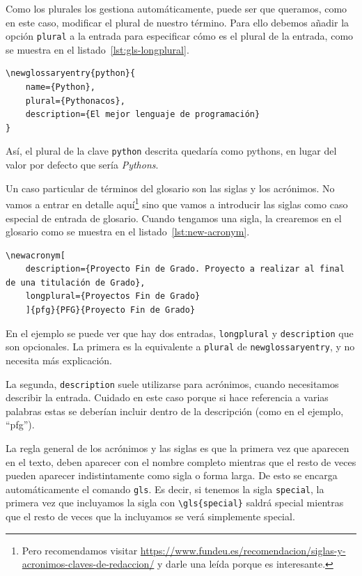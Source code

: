 \documentclass[%
    school=etsisi,%
    type=pfg,%
    degree=61CI,%
]{upm-report}
\begin{document}
Como los plurales los gestiona automáticamente, puede ser que queramos, como en este caso, modificar el plural de nuestro término. Para ello debemos añadir la opción \texttt{plural} a la entrada para especificar cómo es el plural de la entrada, como se muestra en el listado~\ref{lst:gls-longplural}.

\begin{lstlisting}[language={[latex]TeX},caption=Especificando el plural para un término del glosario,label=lst:gls-longplural]
\newglossaryentry{python}{
    name={Python},
    plural={Pythonacos},
    description={El mejor lenguaje de programación}
}
\end{lstlisting}

Así, el plural de la clave \texttt{python} descrita quedaría como \glspl{python}, en lugar del valor por defecto que sería \textit{Pythons}.

Un caso particular de términos del glosario son las siglas y los acrónimos. No vamos a entrar en detalle aquí\footnote{Pero recomendamos visitar \href{https://www.fundeu.es/recomendacion/siglas-y-acronimos-claves-de-redaccion/}{https://www.fundeu.es/recomendacion/siglas-y-acronimos-claves-de-redaccion/} y darle una leída porque es interesante.} sino que vamos a introducir las siglas como caso especial de entrada de glosario. Cuando tengamos una sigla, la crearemos en el glosario como se muestra en el listado~\ref{lst:new-acronym}.

\begin{lstlisting}[language={[latex]TeX},caption=Entrada genérica de una sigla o acrónimo en el glosario,label=lst:new-acronym]
\newacronym[
    description={Proyecto Fin de Grado. Proyecto a realizar al final de una titulación de Grado},
    longplural={Proyectos Fin de Grado}
    ]{pfg}{PFG}{Proyecto Fin de Grado}
\end{lstlisting}

En el ejemplo se puede ver que hay dos entradas, \texttt{longplural} y \texttt{description} que son opcionales. La primera es la equivalente a \texttt{plural} de \texttt{newglossaryentry}, y no necesita más explicación.

La segunda, \texttt{description} suele utilizarse para acrónimos, cuando necesitamos describir la entrada. Cuidado en este caso porque si hace referencia a varias palabras estas se deberían incluir dentro de la descripción (como en el ejemplo, \enquote{\acrlong{pfg}}).

La regla general de los acrónimos y las siglas es que la primera vez que aparecen en el texto, deben aparecer con el nombre completo mientras que el resto de veces pueden aparecer indistintamente como sigla o forma larga. De esto se encarga automáticamente el comando \texttt{gls}. Es decir, si tenemos la sigla \texttt{special}, la primera vez que incluyamos la sigla con \texttt{\textbackslash gls\{special\}} saldrá \gls{special} mientras que el resto de veces que la incluyamos se verá simplemente \gls{special}.
\end{document}
